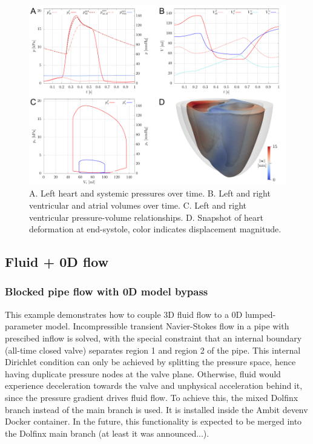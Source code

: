 \documentclass[a4paper,12pt]{report}
\begin{document}
\begin{figure}
\centering
\includegraphics[width=1.0\columnwidth]{fig/heart_syspul_results}
\caption{A. Left heart and systemic pressures over time. B. Left and right ventricular and atrial volumes over time. C. Left and right ventricular pressure-volume relationships. D. Snapshot of heart deformation at end-systole, color indicates displacement magnitude.}
\label{fig:heart_syspul_results}
\end{figure}


\subsection{Fluid + 0D flow}\label{subsec:demos:fluid_flow0d}

\subsubsection*{Blocked pipe flow with 0D model bypass}

This example demonstrates how to couple 3D fluid flow to a 0D lumped-parameter model. Incompressible transient Navier-Stokes flow in a pipe with prescibed inflow is solved,
with the special constraint that an internal boundary (all-time closed valve) separates region 1 and region 2 of the pipe. This internal Dirichlet condition can only be achieved
by splitting the pressure space, hence having duplicate pressure nodes at the valve plane. Otherwise, fluid would experience deceleration towards the valve and unphysical acceleration behind it, since the pressure gradient drives fluid flow. To achieve this, the mixed Dolfinx branch instead of the main branch is used. It is installed inside the Ambit devenv Docker
container. In the future, this functionality is expected to be merged into the Dolfinx main branch (at least it was announced...).\\
\end{document}
